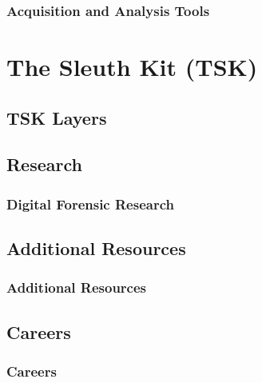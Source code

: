 \documentclass{beamer}
\begin{document}
\begin{frame}
	\frametitle{Acquisition and Analysis Tools}
	\section{The Sleuth Kit (TSK)}
		\subsection{TSK Layers}
\end{frame}

\begin{frame}
	\section{Research}
	\frametitle{Digital Forensic Research}
\end{frame}

\begin{frame}
	\section{Additional Resources}
	\frametitle{Additional Resources}
	
\end{frame}

\begin{frame}
	\section{Careers}
	\frametitle{Careers}
	
\end{frame}
\end{document}

